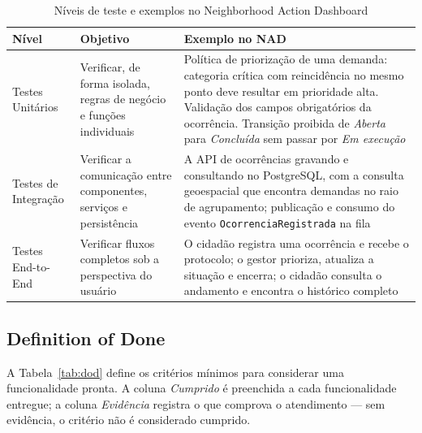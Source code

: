 \documentclass[12pt,a4paper,oneside]{article}
\newcommand{\fonte}[1]{\par\vspace{5pt}{\footnotesize\singlespacing Fonte: #1\par}}
\newcommand{\cab}[1]{\textbf{\footnotesize #1}}
\begin{document}
\begin{table}[H]
\centering
\caption{Níveis de teste e exemplos no Neighborhood Action Dashboard}
\label{tab:tipos}
{\small\singlespacing
\begin{tabularx}{\textwidth}{L{2.8cm} L{4.6cm} X}
\toprule
\cab{Nível} & \cab{Objetivo} & \cab{Exemplo no NAD} \\
\midrule
Testes Unitários & Verificar, de forma isolada, regras de negócio e funções
individuais & Política de priorização de uma demanda: categoria crítica com
reincidência no mesmo ponto deve resultar em prioridade alta. Validação dos
campos obrigatórios da ocorrência. Transição proibida de \emph{Aberta} para
\emph{Concluída} sem passar por \emph{Em execução} \\
\addlinespace
Testes de Integração & Verificar a comunicação entre componentes, serviços e
persistência & A API de ocorrências gravando e consultando no PostgreSQL, com a
consulta geoespacial que encontra demandas no raio de agrupamento; publicação e
consumo do evento \texttt{OcorrenciaRegistrada} na fila \\
\addlinespace
Testes End-to-End & Verificar fluxos completos sob a perspectiva do usuário &
O cidadão registra uma ocorrência e recebe o protocolo; o gestor prioriza,
atualiza a situação e encerra; o cidadão consulta o andamento e encontra o
histórico completo \\
\bottomrule
\end{tabularx}}
\fonte{elaborado pelos autores (2026).}
\end{table}

\subsection{Definition of Done}

A Tabela~\ref{tab:dod} define os critérios mínimos para considerar uma
funcionalidade pronta. A coluna \emph{Cumprido} é preenchida a cada
funcionalidade entregue; a coluna \emph{Evidência} registra o que comprova o
atendimento — sem evidência, o critério não é considerado cumprido.
\end{document}
